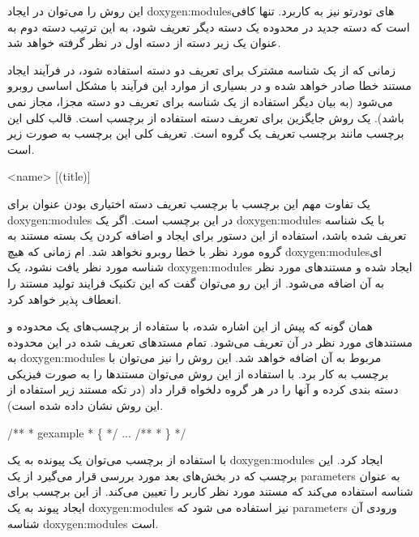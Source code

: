 این روش را می‌توان در ایجاد \glspl{doxygen:module}‌های تودرتو نیز به کاربرد. تنها کافی است که دسته
جدید در محدوده یک دسته دیگر تعریف شود، به این ترتیب دسته دوم به عنوان یک زیر
دسته از دسته اول در نظر گرفته خواهد شد.

زمانی که از یک شناسه مشترک برای تعریف دو دسته استفاده شود، در فرآیند ایجاد
مستند خطا صادر خواهد شده و در بسیاری از موارد این فرآیند با مشکل اساسی روبرو
می‌شود (به بیان دیگر استفاده از یک شناسه برای تعریف دو دسته
مجزا، مجاز نمی باشد). یک روش جایگزین برای تعریف دسته استفاده از برچسب
 است. قالب کلی این برچسب مانند برچسب تعریف یک گروه است. تعریف کلی
این برچسب به صورت زیر است.
\begin{C++}
\addtogroup <name> [(title)]
\end{C++}

یک تفاوت مهم این برچسب با برچسب تعریف دسته  اختیاری بودن عنوان برای \glspl{doxygen:module}
در این برچسب است. اگر یک \glspl{doxygen:module} با یک شناسه تعریف شده باشد، استفاده از این 
دستور برای ایجاد و اضافه کردن یک بسته مستند به گروه مورد نظر با خطا روبرو نخواهد شد.
ام زمانی که هیچ \glspl{doxygen:module}‌ای شناسه مورد نظر یافت نشود، یک \glspl{doxygen:module} ایجاد شده 
و مستندهای مورد نظر به آن اضافه می‌شود. از این رو می‌توان گفت که این تکنیک فرایند تولید
مستند را انعطاف پذیر خواهد کرد.

همان گونه که پیش از این اشاره شده، با ستفاده از برچسب‌های \lr{ \ \{ \ \}} یک محدوده
و مستندهای مورد نظر در آن تعریف می‌شود. تمام مستد‌های تعریف شده در این محدوده به \glspl{doxygen:module} 
مربوط به آن اضافه خواهد شد. این روش را نیز می‌توان با برچسب  به کار برد.
با استفاده از این روش می‌توان مستندها را به صورت فیزیکی دسته بندی کرده و آنها را در
هر گروه دلخواه قرار داد (در تکه مستند زیر استفاده از این روش نشان داده شده است).

\begin{C++}
/**
 * \addtogroup gexample
 * \{
 */
...
/**
 * \}
 */
\end{C++}

با استفاده از برچسب  می‌توان یک پیونده به یک \glspl{doxygen:module} ایجاد کرد. این برچسب که در بخش‌های
بعد مورد بررسی قرار می‌گیرد از یک \glspl{parameter} به عنوان شناسه استفاده می‌کند که مستند مورد نظر
کاربر را تعیین می‌کند. از این برچسب برای ایجاد پیوند به یک \glspl{doxygen:module} نیز استفاده می شود
که \glspl{parameter} ورودی آن شناسه \glspl{doxygen:module} است.

